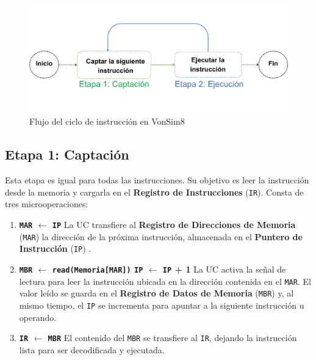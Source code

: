 \documentclass[12pt,oneside]{templates/unerthesis}
\begin{document}
\begin{figure}

{\centering \includegraphics[width=0.85\linewidth]{images/cicloinstruccion3} 

}

\caption{Flujo del ciclo de instrucción en VonSim8}\label{fig:flujoCicloInstruccion}
\end{figure}

\hypertarget{etapa-1-captaciuxf3n}{%
\subsection{Etapa 1: Captación}\label{etapa-1-captaciuxf3n}}

Esta etapa es igual para todas las instrucciones. Su objetivo es leer la instrucción desde la memoria y cargarla en el \textbf{Registro de Instrucciones} (\texttt{IR}). Consta de tres microoperaciones:

\begin{enumerate}
\def\labelenumi{\arabic{enumi}.}
\item
  \textbf{\texttt{MAR} \(\leftarrow\) \texttt{IP}}
  La UC transfiere al \textbf{Registro de Direcciones de Memoria} (\texttt{MAR}) la dirección de la próxima instrucción, almacenada en el \textbf{Puntero de Instrucción} (\texttt{IP}) .
\item
  \textbf{\texttt{MBR} \(\leftarrow\) \texttt{read(Memoria{[}MAR{]})} \textbar{} \texttt{IP} \(\leftarrow\) \texttt{IP} + 1}
  La UC activa la señal de lectura para leer la instrucción ubicada en la dirección contenida en el \texttt{MAR}. El valor leído se guarda en el \textbf{Registro de Datos de Memoria} (\texttt{MBR}) y, al mismo tiempo, el \texttt{IP} se incrementa para apuntar a la siguiente instrucción u operando.
\item
  \textbf{\texttt{IR} \(\leftarrow\) \texttt{MBR}}
  El contenido del \texttt{MBR} se transfiere al \texttt{IR}, dejando la instrucción lista para ser decodificada y ejecutada.
\end{enumerate}
\end{document}
